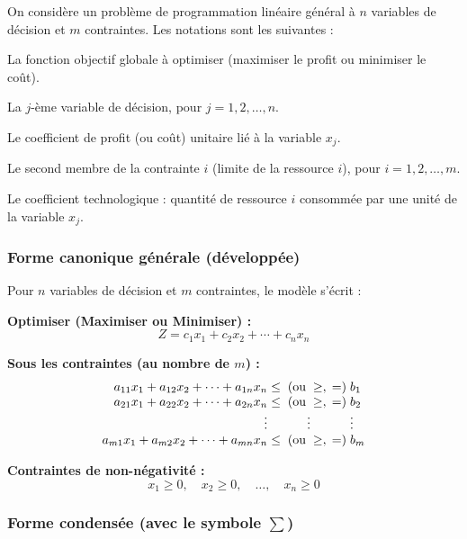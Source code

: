 \documentclass[12pt,a4paper]{article}
\begin{document}
On considère un problème de programmation linéaire général à $n$ variables de décision
et $m$ contraintes. Les notations sont les suivantes :

\begin{description}[noitemsep, leftmargin=2cm, labelwidth=1.7cm]
  \item[$Z$]      La fonction objectif globale à optimiser
                  (maximiser le profit ou minimiser le coût).
  \item[$x_j$]    La $j$-ème variable de décision, pour $j = 1, 2, \ldots, n$.
  \item[$c_j$]    Le coefficient de profit (ou coût) unitaire lié à la variable $x_j$.
  \item[$b_i$]    Le second membre de la contrainte $i$ (limite de la ressource $i$),
                  pour $i = 1, 2, \ldots, m$.
  \item[$a_{ij}$] Le coefficient technologique : quantité de ressource $i$ consommée
                  par une unité de la variable $x_j$.
\end{description}

\subsubsection{Forme canonique générale (développée)}

Pour $n$ variables de décision et $m$ contraintes, le modèle s'écrit :

\noindent\textbf{Optimiser (Maximiser ou Minimiser) :}
\[
Z = c_1 x_1 + c_2 x_2 + \cdots + c_n x_n
\]

\noindent\textbf{Sous les contraintes (au nombre de $m$) :}
\[
\begin{array}{r@{\;}c@{\;}l}
a_{11}x_1 + a_{12}x_2 + \cdots + a_{1n}x_n & \leq\;(\text{ou}\;\geq,\;=) & b_1 \\
a_{21}x_1 + a_{22}x_2 + \cdots + a_{2n}x_n & \leq\;(\text{ou}\;\geq,\;=) & b_2 \\
\vdots & \vdots & \vdots \\
a_{m1}x_1 + a_{m2}x_2 + \cdots + a_{mn}x_n & \leq\;(\text{ou}\;\geq,\;=) & b_m
\end{array}
\]

\noindent\textbf{Contraintes de non-négativité :}
\[
x_1 \geq 0, \quad x_2 \geq 0, \quad \ldots, \quad x_n \geq 0
\]

\subsubsection{Forme condensée (avec le symbole $\sum$)}
\end{document}
